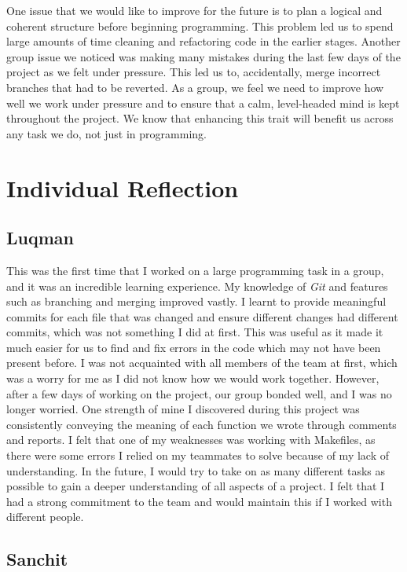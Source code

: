 \documentclass[10pt]{article}
\begin{document}
One issue that we would like to improve for the future is to plan a logical and coherent structure before beginning programming. This problem led us to spend large amounts of time cleaning and refactoring code in the earlier stages. Another group issue we noticed was making many mistakes during the last few days of the project as we felt under pressure. This led us to, accidentally, merge incorrect branches that had to be reverted. As a group, we feel we need to improve how well we work under pressure and to ensure that a calm, level-headed mind is kept throughout the project. We know that enhancing this trait will benefit us across any task we do, not just in programming. 

\section*{Individual Reflection}

\subsection*{Luqman}

This was the first time that I worked on a large programming task in a group, and it was an incredible learning experience. My knowledge of {\sl Git} and features such as branching and merging improved vastly. I learnt to provide meaningful commits for each file that was changed and ensure different changes had different commits, which was not something I did at first. This was useful as it made it much easier for us to find and fix errors in the code which may not have been present before. I was not acquainted with all members of the team at first, which was a worry for me as I did not know how we would work together. However, after a few days of working on the project, our group bonded well, and I was no longer worried. One strength of mine I discovered during this project was consistently conveying the meaning of each function we wrote through comments and reports. I felt that one of my weaknesses was working with Makefiles, as there were some errors I relied on my teammates to solve because of my lack of understanding. In the future, I would try to take on as many different tasks as possible to gain a deeper understanding of all aspects of a project. I felt that I had a strong commitment to the team and would maintain this if I worked with different people. 

\subsection*{Sanchit}
\end{document}
